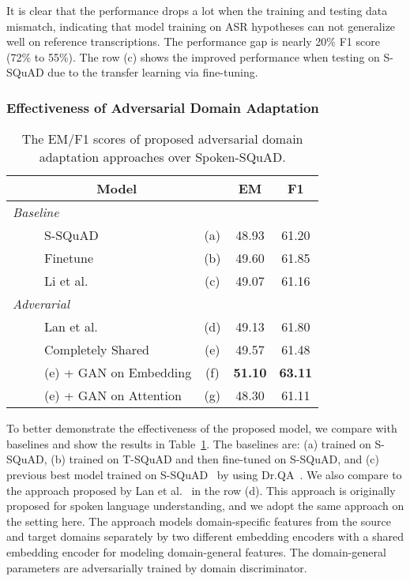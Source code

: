 \documentclass{article}
\begin{document}
It is clear that the performance drops a lot when the training and testing data mismatch, indicating that model training on ASR hypotheses can not generalize well on reference transcriptions.
The performance gap is nearly 20\% F1 score (72\% to 55\%).
The row (c) shows the improved performance when testing on S-SQuAD due to the transfer learning via fine-tuning.



\subsubsection{Effectiveness of Adversarial Domain Adaptation}

\begin{table}[t!]
\centering
\caption{The EM/F1 scores of proposed adversarial domain adaptation approaches over Spoken-SQuAD.}
\label{tab:GAN}
\vspace{2mm}
\begin{tabular}{|lccc|}
\hline
\multicolumn{2}{|c|}{{\textbf{Model}}}  & \textbf{EM} & \textbf{F1}  \\
\hline
\hline
\emph{Baseline} & & &\\
~~~~~S-SQuAD & (a) & 48.93 & 61.20 \\
~~~~~Finetune & (b) & 49.60 & 61.85 \\
~~~~~Li et al.~\cite{li2018spoken} & (c)  & 49.07 & 61.16 \\
\hline
\emph{Adverarial} & & &\\
~~~~~Lan et al.~\cite{lan2018semi} & (d) & 49.13 & 61.80 \\
~~~~~Completely Shared & (e) & 49.57 & 61.48 \\
~~~~~(e) + GAN on Embedding & (f) & \textbf{51.10} & \textbf{63.11} \\
~~~~~(e) + GAN on Attention & (g) & 48.30 & 61.11 \\
\hline
\end{tabular}
\end{table}

To better demonstrate the effectiveness of the proposed model, we compare with baselines and show the results in Table~\ref{tab:GAN}. 
The baselines are: (a) trained on S-SQuAD, (b) trained on T-SQuAD and then fine-tuned on S-SQuAD, and (c) previous best model trained on S-SQuAD~\cite{li2018spoken} by using Dr.QA~\cite{chen2017reading}.
We also compare to the approach proposed by Lan et al.~\cite{lan2018semi} in the row (d).
This approach is originally proposed for spoken language understanding, and we adopt the same approach on the setting here.
The approach models domain-specific features from the source and target domains separately by two different embedding encoders with a shared embedding encoder for modeling domain-general features.
The domain-general parameters are adversarially trained by domain discriminator. 
\end{document}
